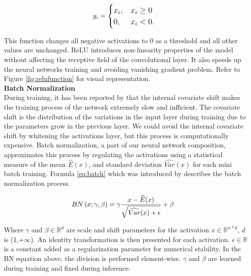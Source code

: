 \documentclass{vldb}
\begin{document}
\begin{align}
   & \large \large \ y_{i} = \begin{cases} x_{i}, & x_{i}\geq 0 \\ 0, & x_{i}< 0. \end{cases}
\end{align}

This function changes all negative activations to 0 as a threshold and all other values are unchanged. ReLU introduces non-linearity properties of the model without affecting the receptive field of the convolutional layer. It also speeds up the neural networks training and avoiding vanishing gradient problem. Refer to Figure \ref{fig:relufunction} for visual representation.\\ 

\textbf{Batch Normalization}\\

During training, it has been reported by  \cite{ioffe2015batch} that the internal covariate shift makes the training process of the network extremely slow and infficient. The covariate shift is the distribution of the variations in the input layer during training due to the parameters grow in the previous layer. We could avoid the internal covariate shift by whitening the activations layer, but this process is computationally expensive. Batch normalization, a part of our neural network composition, approximates this process by regulating the activations using a statistical measure of the mean $\widehat{E}(x)$, and standard deviation $\widehat{Var}(x)$  for each mini batch training. Formula \ref{eq:batch} which was introduced by \cite{ioffe2015batch} describes the batch normalization process.

\begin{align} \label{eq:batch}
   & \large BN\left ( x;\gamma ,\beta \right )=\gamma \frac{x-\widehat{E}(x)}{\sqrt{\widehat{Var}(x)+\epsilon }} +\beta
\end{align}

Where $\gamma$ and $\beta \in \mathbb{R}^{d}$ are scale and shift parameters for the activation $x \in \mathbb{R}^{n*d}$, $d$ is \in (1,+$\infty$). An identity transformation is then presented for each activation. $\epsilon \in \mathbb{R}$ is a constant added as a regularization parameter for numerical stability. In the BN equation above, the division is performed element-wise. $\gamma$ and $\beta$ are learned during training and fixed during inference.\\
\end{document}
